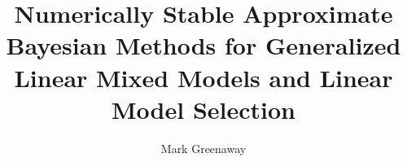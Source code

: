 \documentclass[PhD,stats]{usydthesis}[12pt]
\title{Numerically Stable Approximate Bayesian Methods for Generalized Linear
       Mixed Models and Linear Model Selection}
\author{Mark Greenaway}
\begin{document}
\makeatletter
 
 


\makeatother

\maketitle

\tableofcontents
\listoffigures








\begin{subappendices}
    
\end{subappendices}

% 

\backmatter



\end{document}
